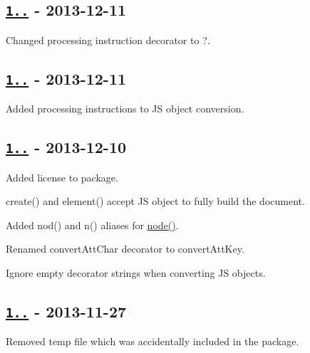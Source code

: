 \subsection*{\href{https://github.com/oozcitak/xmlbuilder-js/compare/v1.1.1...v1.1.2}{\tt 1..} -\/ 2013-\/12-\/11}


\begin{DoxyItemize}
\item Changed processing instruction decorator to {\ttfamily ?}.
\end{DoxyItemize}

\subsection*{\href{https://github.com/oozcitak/xmlbuilder-js/compare/v1.1.0...v1.1.1}{\tt 1..} -\/ 2013-\/12-\/11}


\begin{DoxyItemize}
\item Added processing instructions to JS object conversion.
\end{DoxyItemize}

\subsection*{\href{https://github.com/oozcitak/xmlbuilder-js/compare/v1.0.2...v1.1.0}{\tt 1..} -\/ 2013-\/12-\/10}


\begin{DoxyItemize}
\item Added license to package.
\item {\ttfamily create()} and {\ttfamily element()} accept JS object to fully build the document.
\item Added {\ttfamily nod()} and {\ttfamily n()} aliases for {\ttfamily \mbox{\hyperlink{structnode}{node()}}}.
\item Renamed {\ttfamily convert\+Att\+Char} decorator to {\ttfamily convert\+Att\+Key}.
\item Ignore empty decorator strings when converting JS objects.
\end{DoxyItemize}

\subsection*{\href{https://github.com/oozcitak/xmlbuilder-js/compare/v1.0.1...v1.0.2}{\tt 1..} -\/ 2013-\/11-\/27}


\begin{DoxyItemize}
\item Removed temp file which was accidentally included in the package.
\end{DoxyItemize}

